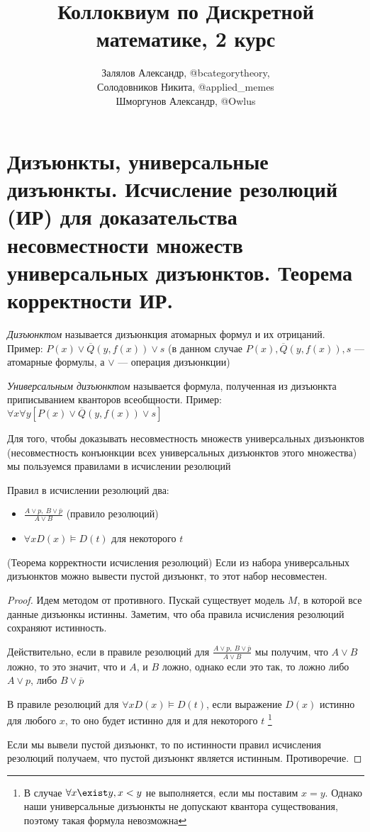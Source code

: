 \documentclass{article}
\title{Коллоквиум по Дискретной математике, 2 курс}
\author{Залялов Александр, @bcategorytheory,\\  Солодовников Никита, @applied\_memes \\ Шморгунов Александр, @Owlus }
\date{}
\begin{document}
\maketitle

\setcounter{section}{19}
\section{Дизъюнкты, универсальные дизъюнкты. Исчисление резолюций (ИР) для доказательства несовместности множеств универсальных дизъюнктов. Теорема корректности ИР.}
\begin{definition}
	\textit{Дизъюнктом} называется дизъюнкция атомарных формул и их отрицаний.\\ 
	Пример: $P(x) \vee \overline Q(y, f(x)) \vee s$ (в данном случае $P(x), \overline Q(y, f(x)), s$ --- атомарные формулы, а $\vee$ --- операция дизъюнкции)
\end{definition}
\begin{definition}
	\textit{Универсальным дизъюнктом} называется формула, полученная из дизъюнкта приписыванием кванторов всеобщности. Пример: $\forall x\forall y [P(x) \vee \overline Q(y, f(x)) \vee s]$
\end{definition}
Для того, чтобы доказывать несовместность множеств универсальных дизъюнктов (несовместность конъюнкции всех универсальных дизъюнктов этого множества) мы пользуемся правилами в исчислении резолюций
\vspace{2mm}

Правил в исчислении резолюций два:
\begin{itemize}
	\item $\tfrac{A \vee p,\ B \vee \overline p}{A \vee B}$ (правило резолюций)
	\item $\forall x D(x) \vDash D(t)$ для некоторого $t$ 
\end{itemize}

\begin{theorem}{(Теорема корректности исчисления резолюций)}
	Если из набора универсальных дизъюнктов можно вывести пустой дизъюнкт, то этот набор несовместен.
\end{theorem}
\begin{proof}
	Идем методом от противного. Пускай существует модель $M$, в которой все данные дизъюнкы истинны.
	Заметим, что оба правила исчисления резолюций сохраняют истинность.
	
	Действительно, если в правиле резолюций для $\tfrac{A \vee p,\ B \vee \overline p}{A \vee B}$ мы получим, что $A \vee B$ ложно, то это значит, что и $A$, и $B$ ложно, однако если это так, то ложно либо $A \vee p$, либо $B \vee \overline p$
	
	В правиле резолюций для $\forall x D(x) \vDash D(t)$, если выражение $D(x)$ истинно для любого $x$, то оно будет истинно для и для некоторого $t$ \footnote{В случае $\forall x \exist y, x < y$ не выполняется, если мы поставим $x = y$. Однако наши универсальные дизъюнкты не допускают квантора существования, поэтому такая формула невозможна}
	
	Если мы вывели пустой дизъюнкт, то по истинности правил исчисления резолюций получаем, что пустой дизъюнкт является истинным. Противоречие.
\end{proof}
\end{document}
